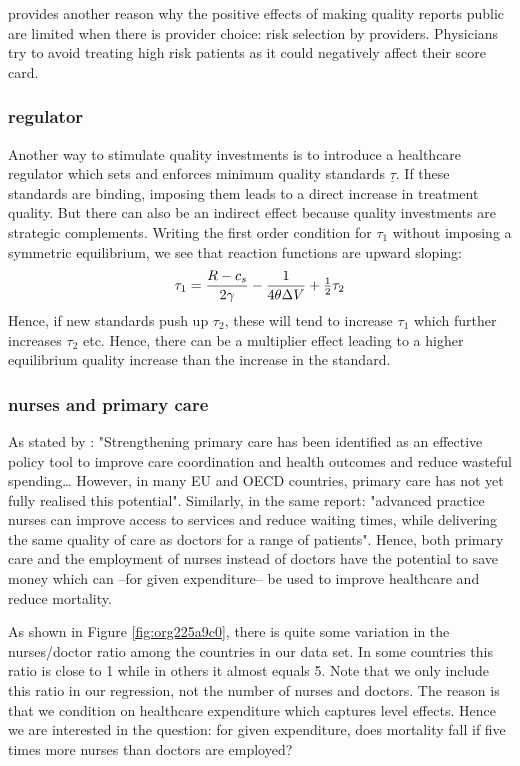 \documentclass{article}
\begin{document}
\cite{dranoveReportCards2003} provides another reason why the positive effects of making quality reports public are limited when there is provider choice: risk selection by providers. Physicians try to avoid treating high risk patients as it could negatively affect their score card.

\subsubsection{regulator}
\label{sec:org5d3fc05}

Another way to stimulate quality investments is to introduce a healthcare regulator which sets and enforces minimum quality standards \(\underline \tau\). If these standards are binding, imposing them leads to a direct increase in treatment quality. But there can also be an indirect effect because quality investments are strategic complements. Writing the first order condition for \(\tau_1\) without imposing a symmetric equilibrium, we see that reaction functions are upward sloping: 
\begin{equation}
\label{eq:28}
\tau_1 = \frac{R-c_s}{2\gamma}-\frac{1}{4\theta \Delta V} + \textstyle{1\over 2}  \tau_2
\end{equation}
Hence, if new standards push up \(\tau_2\), these will tend to increase \(\tau_1\) which further increases \(\tau_2\) etc. Hence, there can be a multiplier effect leading to a higher equilibrium quality increase than the increase in the standard.

\subsubsection{nurses and primary care}
\label{sec:org4508dcb}

As stated by \cite{OECD_2020}: "Strengthening primary care has been identified as an effective policy tool to improve care coordination and health outcomes and reduce wasteful spending\ldots{} However, in many EU and OECD countries, primary care has not yet fully realised this potential". Similarly, in the same report: "advanced practice nurses can improve access to services and reduce waiting times, while delivering the same quality of care as doctors for a range of patients". Hence, both primary care and the employment of nurses instead of doctors have the potential to save money which can --for given expenditure-- be used to improve healthcare and reduce mortality.

As shown in Figure \ref{fig:org225a9c0}, there is quite some variation in the nurses/doctor ratio among the countries in our data set. In some countries this ratio is close to 1 while in others it almost equals 5. Note that we only include this ratio in our regression, not the number of nurses and doctors. The reason is that we condition on healthcare expenditure which captures level effects. Hence we are interested in the question: for given expenditure, does mortality fall if five times more nurses than doctors are employed?
\end{document}
